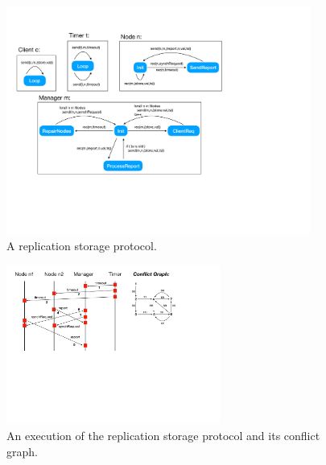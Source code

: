 %

%

\begin{figure}[t]
\includegraphics[width=10cm]{replication.pdf}
\caption{A replication storage protocol.}
\label{fig:replication}
\end{figure}

\begin{figure}[t]
\includegraphics[width=7cm]{MSC-storage.pdf}
\caption{An execution of the replication storage protocol and its conflict graph.}
\label{fig:replic-exec}
\end{figure}
